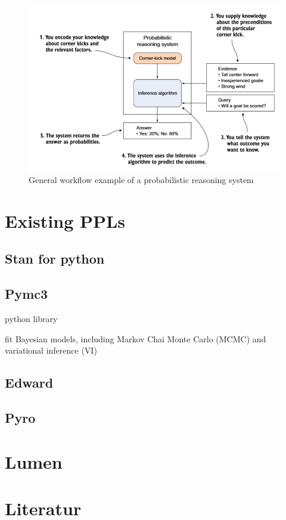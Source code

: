\documentclass{article}
\begin{document}
\begin{figure}
\includegraphics[width=\textwidth]{images/probabilistic_reasoning_system.PNG}
\caption[General workflow example of a probabilistic reasoning system. Source: \cite{9781617292330}]{General workflow example of a probabilistic reasoning system}
\label{fig:example_prs}
\end{figure}


\section{Existing PPLs}

\subsection{Stan for python}

\subsection{Pymc3}

python library

fit Bayesian models, including Markov Chai Monte Carlo (MCMC) and variational inference (VI)


\subsection{Edward}

\subsection{Pyro}


\section{Lumen}

\listoffigures
        
\section{Literatur}



\end{document}
